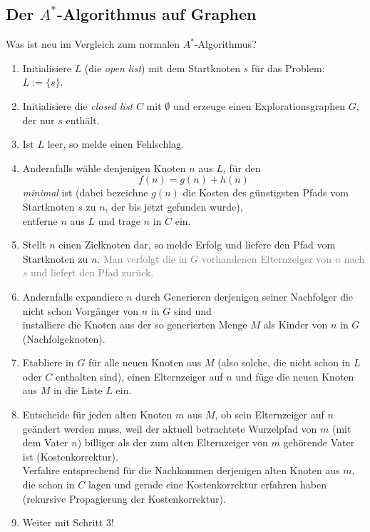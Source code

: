 \documentclass[runningheads,deutsch]{llncs}
\begin{document}
\subsection{Der $A^*$-Algorithmus auf Graphen}

Was ist neu im Vergleich zum normalen $A^*$-Algorithmus?

\begin{enumerate}
    \item Initialisiere $L$ (die \textit{open list}) mit dem Startknoten $s$ für das Problem: $L := \{s\}$.
    \item \color{red} Initialisiere die \textit{closed list} $C$ mit $\emptyset$ und erzeuge einen Explorationsgraphen $G$, der nur $s$ enthält. \color{black}
    \item Ist $L$ leer, so melde einen Fehlschlag.
    \item Andernfalls wähle denjenigen Knoten $n$ aus $L$, für den 
    \[ f(n) = g(n) + h(n) \]
    \textit{minimal} ist \color{red} (dabei bezeichne $g(n)$ die Kosten des günstigsten Pfads vom Startknoten $s$ zu $n$, der bis jetzt gefunden wurde), \\
    entferne $n$ aus $L$ und trage $n$ in $C$ ein. \color{black}
    \item Stellt $n$ einen Zielknoten dar, so melde Erfolg und liefere den Pfad vom Startknoten zu $n$. \textcolor{gray}{Man verfolgt die in $G$ vorhandenen Elternzeiger von $n$ nach $s$ und liefert den Pfad zurück.}
    \item \color{red} Andernfalls expandiere $n$ durch Generieren derjenigen seiner Nachfolger die nicht schon Vorgänger von $n$ in $G$ sind und \\ installiere die Knoten aus der so generierten Menge $M$ als Kinder von $n$ in $G$ (Nachfolgeknoten).
    \item Etabliere in $G$ für alle neuen Knoten aus $M$ (also solche, die nicht schon in $L$ oder $C$ enthalten sind), einen Elternzeiger auf $n$ und füge die neuen Knoten aus $M$ in die Liste $L$ ein.
    \item Entscheide für jeden alten Knoten $m$ aus $M$, ob sein Elternzeiger auf $n$ geändert werden muss, weil der aktuell betrachtete Wurzelpfad von $m$ (mit dem Vater $n$) billiger als der zum alten Elternzeiger von $m$ gehörende Vater ist (Kostenkorrektur). \\ Verfahre entsprechend für die Nachkommen derjenigen alten Knoten aus $m$, die schon in $C$ lagen und gerade eine Kostenkorrektur erfahren haben (rekursive Propagierung der Kostenkorrektur).
    \item Weiter mit Schritt $3$!
\end{enumerate}
\end{document}
